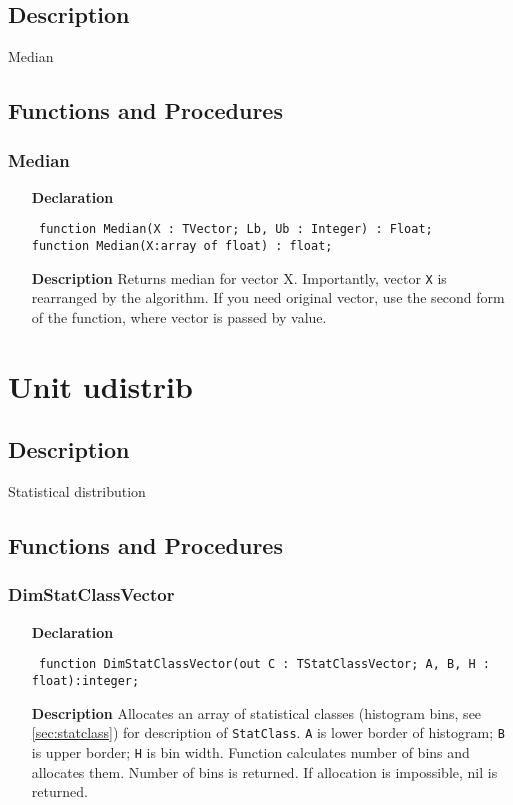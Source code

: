 \documentclass[12pt,a4paper,oneside]{report}
\newcommand{\declarationitem}[1]{\textbf{#1}}
\newcommand{\descriptiontitle}[1]{\textbf{#1}}
\newcommand{\code}[1]{\texttt{#1}}
\begin{document}
\subsection{Description}
Median 
\subsection{Functions and Procedures}
\subsubsection{Median}
\label{umedian-Median}
\begin{itemize}\item[\declarationitem{Declaration}\hfill]
	\begin{flushleft}
		\code{
			function Median(X : TVector; Lb, Ub : Integer) : Float;}\\
		\code{function Median(X:array of float) : float;}
	\end{flushleft}
	\item[\descriptiontitle{Description}]
	Returns median for vector X. Importantly, vector \code{X} is rearranged by the algorithm. If you need original vector, use the second form of the function, where vector is passed by value.
\end{itemize}
\section{Unit udistrib}
\label{udistrib}
\subsection{Description}
Statistical distribution 
\subsection{Functions and Procedures}
\subsubsection{DimStatClassVector}
\label{udistrib-DimStatClassVector}
\begin{itemize}\item[\declarationitem{Declaration}\hfill]
	\begin{flushleft}
		\code{
			function DimStatClassVector(out C : TStatClassVector; A, B, H : float):integer;}
	\end{flushleft}
	\item[\descriptiontitle{Description}]
	Allocates an array of statistical classes (histogram bins, see \ref{sec:statclass}) for description of \code{StatClass}.
	\code{A} is lower border of histogram; \code{B} is upper border; \code{H} is bin width.
	Function calculates number of bins and allocates them. Number of bins is returned. If allocation is impossible, nil is returned.
\end{itemize}
\end{document}
